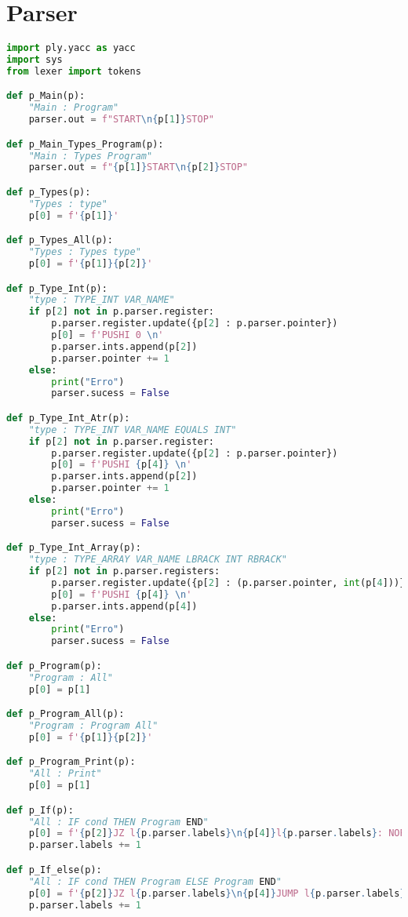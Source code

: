 \documentclass[11pt,a4paper]{report}
\begin{document}
    \section{Parser}
    \begin{lstlisting}[language=python,firstnumber=1]
        import ply.yacc as yacc
import sys
from lexer import tokens

def p_Main(p):
    "Main : Program"
    parser.out = f"START\n{p[1]}STOP"

def p_Main_Types_Program(p):
    "Main : Types Program"
    parser.out = f"{p[1]}START\n{p[2]}STOP"

def p_Types(p):
    "Types : type"
    p[0] = f'{p[1]}'

def p_Types_All(p):
    "Types : Types type"
    p[0] = f'{p[1]}{p[2]}'

def p_Type_Int(p):
    "type : TYPE_INT VAR_NAME"
    if p[2] not in p.parser.register:
        p.parser.register.update({p[2] : p.parser.pointer})
        p[0] = f'PUSHI 0 \n'
        p.parser.ints.append(p[2])
        p.parser.pointer += 1
    else:
        print("Erro")
        parser.sucess = False

def p_Type_Int_Atr(p):
    "type : TYPE_INT VAR_NAME EQUALS INT"
    if p[2] not in p.parser.register:
        p.parser.register.update({p[2] : p.parser.pointer})
        p[0] = f'PUSHI {p[4]} \n'
        p.parser.ints.append(p[2])
        p.parser.pointer += 1
    else:
        print("Erro")
        parser.sucess = False

def p_Type_Int_Array(p):
    "type : TYPE_ARRAY VAR_NAME LBRACK INT RBRACK"
    if p[2] not in p.parser.registers:
        p.parser.register.update({p[2] : (p.parser.pointer, int(p[4]))})
        p[0] = f'PUSHI {p[4]} \n'
        p.parser.ints.append(p[4])
    else:
        print("Erro")
        parser.sucess = False

def p_Program(p):
    "Program : All"
    p[0] = p[1]

def p_Program_All(p):
    "Program : Program All"
    p[0] = f'{p[1]}{p[2]}'

def p_Program_Print(p):
    "All : Print"
    p[0] = p[1]

def p_If(p):
    "All : IF cond THEN Program END"
    p[0] = f'{p[2]}JZ l{p.parser.labels}\n{p[4]}l{p.parser.labels}: NOP\n'
    p.parser.labels += 1

def p_If_else(p):
    "All : IF cond THEN Program ELSE Program END"
    p[0] = f'{p[2]}JZ l{p.parser.labels}\n{p[4]}JUMP l{p.parser.labels}\nl{p.parser.labels}: NOP\n{p.parser.labels}: NOP\n'
    p.parser.labels += 1


\end{lstlisting}
\end{document}
